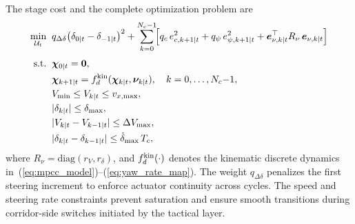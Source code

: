 \documentclass{iopjournal}
\begin{document}
The stage cost and the complete optimization problem are
\begin{equation}
\begin{aligned}
\min_{\mathcal{U}_t}\;\;&
q_{\Delta\delta}\bigl(\delta_{0|t}-\delta_{-1|t}\bigr)^2
+\sum_{k=0}^{N_c-1}\!
\Bigl[
q_c\, e_{c,k+1|t}^2
+q_\psi\, e_{\psi,k+1|t}^2
+\bm{e}_{\nu,k|t}^\top R_\nu\,\bm{e}_{\nu,k|t}
\Bigr]\\[3pt]
\mathrm{s.t.}\;\;&
\bm{\chi}_{0|t}=\bm{0},\\
&\bm{\chi}_{k+1|t}
=f_d^{\rm kin}(\bm{\chi}_{k|t},\bm{\nu}_{k|t}),
\quad k=0,\ldots,N_c{-}1,\\
&V_{\min}\le V_{k|t}\le v_{x,\max},\\
&|\delta_{k|t}|\le\delta_{\max},\\
&|V_{k|t}-V_{k-1|t}|\le\Delta V_{\max},\\
&|\delta_{k|t}-\delta_{k-1|t}|\le\dot\delta_{\max}\,T_c,
\end{aligned}
\label{eq:mpcc_nlp}
\end{equation}
where $R_\nu=\mathrm{diag}(r_V,r_\delta)$, and
$f_d^{\rm kin}(\cdot)$ denotes the kinematic discrete dynamics
in~(\ref{eq:mpcc_model})--(\ref{eq:yaw_rate_map}).
The weight $q_{\Delta\delta}$ penalizes the first steering increment to
enforce actuator continuity across cycles.  The speed and steering rate
constraints prevent saturation and ensure smooth transitions during
corridor-side switches initiated by the tactical layer.
\end{document}
